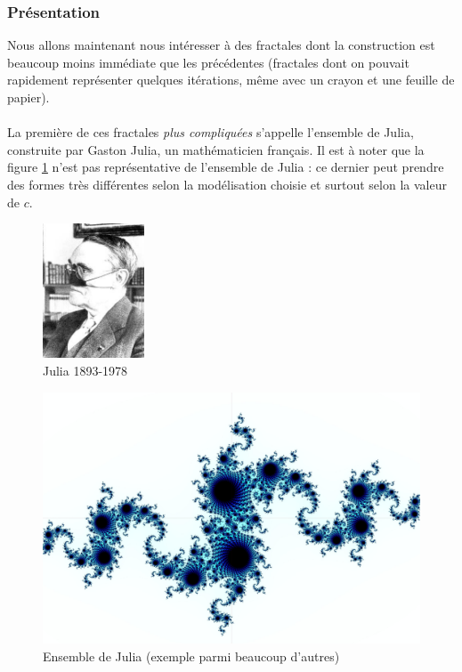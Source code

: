 \documentclass[a4paper,10pt]{report}
\begin{document}
\subsubsection{Présentation}
\begin{minipage}[c]{.70\linewidth}
	\indent Nous allons maintenant nous intéresser à des fractales dont la construction est beaucoup moins immédiate que les précédentes (fractales dont on pouvait rapidement représenter quelques itérations, même avec un crayon et une feuille de papier). \\ \\
	La première de ces fractales \textit{plus compliquées} s'appelle l'ensemble de Julia, construite par Gaston Julia, un mathématicien français. Il est à noter que la figure \ref{julia} n'est pas représentative de l'ensemble de Julia : ce dernier peut prendre des formes très différentes selon la modélisation choisie et surtout selon la valeur de $c$. 
\end{minipage} \hfill
\begin{minipage}[c]{.05\linewidth}
\end{minipage} \hfill
\begin{minipage}[c]{.21\linewidth}
	\begin{figure}[H]
	\includegraphics[height=4cm]{mr_julia.jpg}
	\caption{Julia 1893-1978}
	\end{figure}
\end{minipage}

\begin{figure}[H]
\centering
\caption{Ensemble de Julia (exemple parmi beaucoup d'autres)}
\label{julia}
\centering
\includegraphics[width=14cm]{julia.jpg}
\end{figure}
\end{document}
